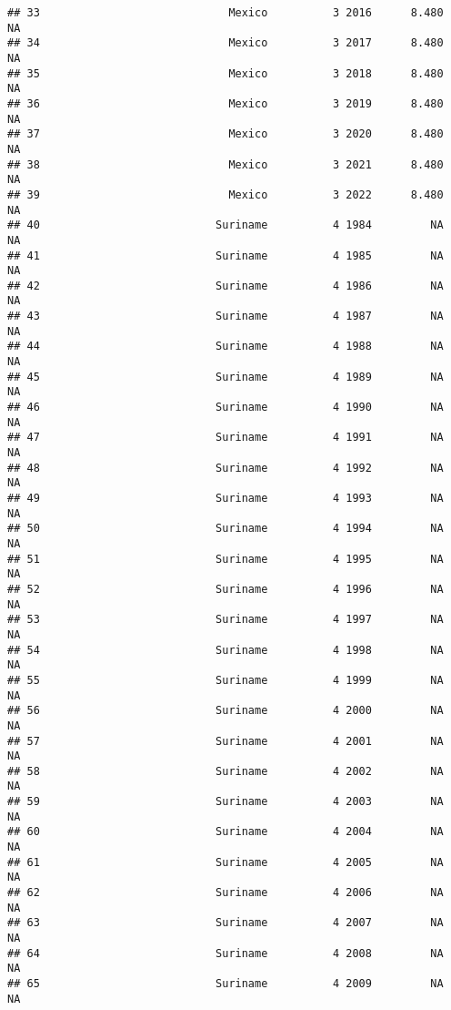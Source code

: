 \documentclass[
]{article}
\begin{document}
\begin{verbatim}
## 33                             Mexico          3 2016      8.480         NA
## 34                             Mexico          3 2017      8.480         NA
## 35                             Mexico          3 2018      8.480         NA
## 36                             Mexico          3 2019      8.480         NA
## 37                             Mexico          3 2020      8.480         NA
## 38                             Mexico          3 2021      8.480         NA
## 39                             Mexico          3 2022      8.480         NA
## 40                           Suriname          4 1984         NA         NA
## 41                           Suriname          4 1985         NA         NA
## 42                           Suriname          4 1986         NA         NA
## 43                           Suriname          4 1987         NA         NA
## 44                           Suriname          4 1988         NA         NA
## 45                           Suriname          4 1989         NA         NA
## 46                           Suriname          4 1990         NA         NA
## 47                           Suriname          4 1991         NA         NA
## 48                           Suriname          4 1992         NA         NA
## 49                           Suriname          4 1993         NA         NA
## 50                           Suriname          4 1994         NA         NA
## 51                           Suriname          4 1995         NA         NA
## 52                           Suriname          4 1996         NA         NA
## 53                           Suriname          4 1997         NA         NA
## 54                           Suriname          4 1998         NA         NA
## 55                           Suriname          4 1999         NA         NA
## 56                           Suriname          4 2000         NA         NA
## 57                           Suriname          4 2001         NA         NA
## 58                           Suriname          4 2002         NA         NA
## 59                           Suriname          4 2003         NA         NA
## 60                           Suriname          4 2004         NA         NA
## 61                           Suriname          4 2005         NA         NA
## 62                           Suriname          4 2006         NA         NA
## 63                           Suriname          4 2007         NA         NA
## 64                           Suriname          4 2008         NA         NA
## 65                           Suriname          4 2009         NA         NA

\end{verbatim}
\end{document}
